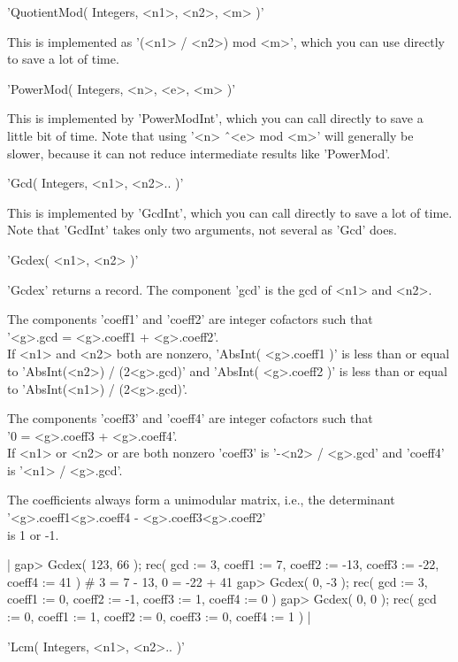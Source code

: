'QuotientMod( Integers, <n1>, <n2>, <m> )'

This  is implemented as   '(<n1> /  <n2>)  mod <m>',   which  you can use
directly to save a lot of time.

'PowerMod( Integers, <n>, <e>, <m> )'

This is implemented by 'PowerModInt', which you can call directly to save
a  little bit  of  time.   Note that  using  '<n> \^\  <e> mod <m>'  will
generally  be slower, because it can not reduce intermediate results like
'PowerMod'.

'Gcd( Integers, <n1>, <n2>.. )'

This is implemented by  'GcdInt', which you  can call  directly to save a
lot of time.  Note that 'GcdInt' takes only two arguments, not several as
'Gcd' does.

'Gcdex( <n1>, <n2> )'

'Gcdex'  returns a record.  The component  'gcd' is the   gcd of <n1> and
<n2>.

The components   'coeff1' and  'coeff2' are  integer  cofactors such that\\
'<g>.gcd =  <g>.coeff1 +  <g>.coeff2'.\\
If <n1> and <n2> both are nonzero, 'AbsInt( <g>.coeff1 )' is less than or
equal to 'AbsInt(<n2>) / (2\*<g>.gcd)' and 'AbsInt( <g>.coeff2 )' is less
than or equal to 'AbsInt(<n1>) / (2\*<g>.gcd)'.

The components 'coeff3' and 'coeff4'  are  integer  cofactors  such  that\\
'0 = <g>.coeff3  + <g>.coeff4'.\\
If <n1> or <n2>  or are  both nonzero  'coeff3' is '-<n2>  / <g>.gcd' and
'coeff4' is '<n1> / <g>.gcd'.

The coefficients always form a  unimodular matrix, i.e., the determinant\\
'<g>.coeff1\*<g>.coeff4 -  <g>.coeff3\*<g>.coeff2'\\
is 1 or -1.

|    gap> Gcdex( 123, 66 );
    rec(
      gcd := 3,
      coeff1 := 7,
      coeff2 := -13,
      coeff3 := -22,
      coeff4 := 41 )
          # 3 = 7 - 13, 0 = -22 + 41
    gap> Gcdex( 0, -3 );
    rec(
      gcd := 3,
      coeff1 := 0,
      coeff2 := -1,
      coeff3 := 1,
      coeff4 := 0 )
    gap> Gcdex( 0, 0 );
    rec(
      gcd := 0,
      coeff1 := 1,
      coeff2 := 0,
      coeff3 := 0,
      coeff4 := 1 ) |

'Lcm( Integers, <n1>, <n2>.. )'

